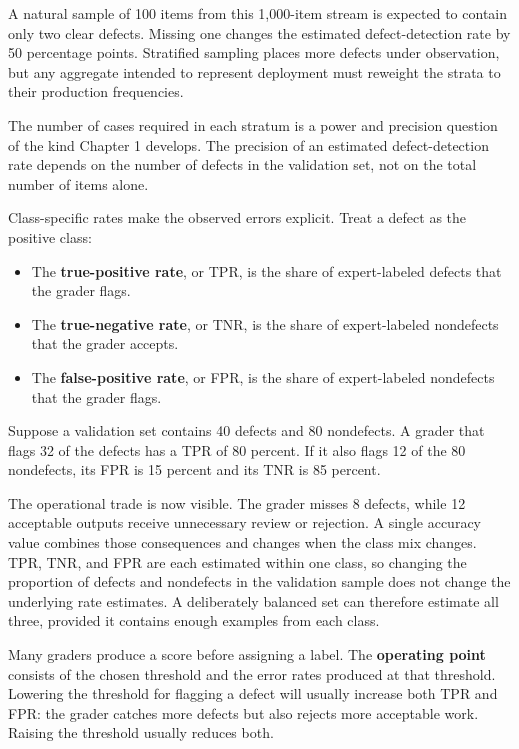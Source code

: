 A natural sample of 100 items from this 1,000-item stream is expected to contain only two clear defects. Missing one changes the estimated defect-detection rate by 50 percentage points. Stratified sampling places more defects under observation, but any aggregate intended to represent deployment must reweight the strata to their production frequencies.

The number of cases required in each stratum is a power and precision question of the kind Chapter 1 develops. The precision of an estimated defect-detection rate depends on the number of defects in the validation set, not on the total number of items alone.

Class-specific rates make the observed errors explicit. Treat a defect as the positive class:

\begin{itemize}
\tightlist
\item
  The \textbf{true-positive rate}, or TPR, is the share of expert-labeled defects that the grader flags.
\item
  The \textbf{true-negative rate}, or TNR, is the share of expert-labeled nondefects that the grader accepts.
\item
  The \textbf{false-positive rate}, or FPR, is the share of expert-labeled nondefects that the grader flags.
\end{itemize}

Suppose a validation set contains 40 defects and 80 nondefects. A grader that flags 32 of the defects has a TPR of 80 percent. If it also flags 12 of the 80 nondefects, its FPR is 15 percent and its TNR is 85 percent.

The operational trade is now visible. The grader misses 8 defects, while 12 acceptable outputs receive unnecessary review or rejection. A single accuracy value combines those consequences and changes when the class mix changes. TPR, TNR, and FPR are each estimated within one class, so changing the proportion of defects and nondefects in the validation sample does not change the underlying rate estimates. A deliberately balanced set can therefore estimate all three, provided it contains enough examples from each class.

Many graders produce a score before assigning a label. The \textbf{operating point} consists of the chosen threshold and the error rates produced at that threshold. Lowering the threshold for flagging a defect will usually increase both TPR and FPR: the grader catches more defects but also rejects more acceptable work. Raising the threshold usually reduces both.

